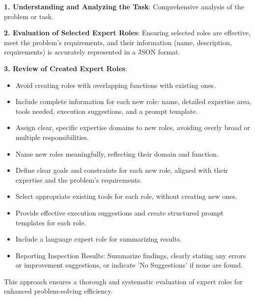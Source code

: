 \textbf{1. Understanding and Analyzing the Task}: Comprehensive analysis of the problem or task.

\textbf{2. Evaluation of Selected Expert Roles}: Ensuring selected roles are effective, meet the problem's requirements, and their information (name, description, requirements) is accurately represented in a JSON format.

\textbf{3. Review of Created Expert Roles}:
\begin{itemize}
    \item Avoid creating roles with overlapping functions with existing ones.
    \item Include complete information for each new role: name, detailed expertise area, tools needed, execution suggestions, and a prompt template.
    \item Assign clear, specific expertise domains to new roles, avoiding overly broad or multiple responsibilities.
    \item Name new roles meaningfully, reflecting their domain and function.
    \item Define clear goals and constraints for each new role, aligned with their expertise and the problem's requirements.
    \item Select appropriate existing tools for each role, without creating new ones.
    \item Provide effective execution suggestions and create structured prompt templates for each role.
    \item Include a language expert role for summarizing results.
    \item Reporting Inspection Results: Summarize findings, clearly stating any errors or improvement suggestions, or indicate 'No Suggestions' if none are found.
\end{itemize}

This approach ensures a thorough and systematic evaluation of expert roles for enhanced problem-solving efficiency.

